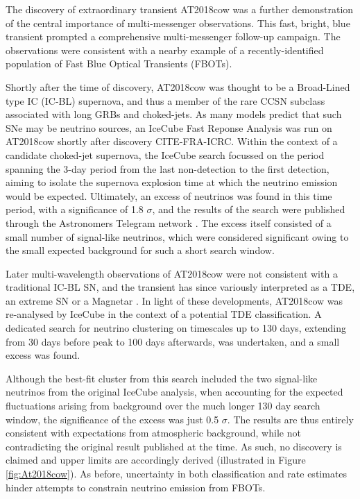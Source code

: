 \documentclass{PoS}
\begin{document}
The discovery of extraordinary transient AT2018cow was a further demonstration of the central importance of multi-messenger observations.  This fast, bright, blue transient prompted a comprehensive multi-messenger follow-up campaign. The observations were consistent with a nearby example of a recently-identified population of Fast Blue Optical Transients (FBOTs). 

Shortly after the time of discovery, AT2018cow was thought to be a Broad-Lined type IC (IC-BL) supernova, and thus a member of the rare CCSN subclass associated with long GRBs and choked-jets. As many models predict that such SNe may be neutrino sources, an IceCube Fast Reponse Analysis was run on AT2018cow shortly after discovery CITE-FRA-ICRC. Within the context of a candidate choked-jet supernova, the IceCube search focussed on the period spanning the 3-day period from the last non-detection to the first detection, aiming to isolate the supernova explosion time at which the neutrino emission would be expected. Ultimately, an excess of neutrinos was found in this time period, with a significance of 1.8 $\sigma$, and the results of the search were published through the Astronomers Telegram network \cite{2018ATel11785....1B}. The excess itself consisted of a small number of signal-like neutrinos, which were considered significant owing to the small expected background for such a short search window.

Later multi-wavelength observations of AT2018cow were not consistent with a traditional IC-BL SN, and the transient has since variously interpreted as a TDE, an extreme SN or a Magnetar \cite{Perley:2018oky}. In light of these developments, AT2018cow was re-analysed by IceCube in the context of a potential TDE classification. A dedicated search for neutrino clustering on timescales up to 130 days, extending from 30 days before peak to 100 days afterwards, was undertaken, and a small excess was found.

Although the best-fit cluster from this search included the two signal-like neutrinos from the original IceCube analysis, when accounting for the expected fluctuations arising from background over the much longer 130 day search window, the significance of the excess was just 0.5 $\sigma$. The results are thus entirely consistent with expectations from atmospheric background, while not contradicting the original result published at the time. As such, no discovery is claimed and upper limits are accordingly derived (illustrated in Figure \ref{fig:At2018cow}). As before, uncertainty in both classification and rate estimates hinder attempts to constrain neutrino emission from FBOTs.
\end{document}
